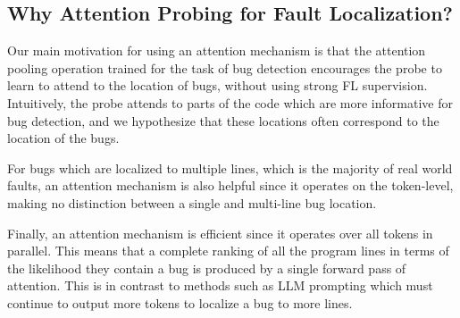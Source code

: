 \subsection{Why Attention Probing for Fault Localization?}
Our main motivation for using an attention mechanism is that the attention pooling operation trained for the task of bug detection encourages the probe to learn to attend to the location of bugs, without using strong FL supervision.
Intuitively, the probe attends to parts of the code which are more informative for bug detection, and we hypothesize that these locations often correspond to the location of the bugs.

For bugs which are localized to multiple lines, which is the majority of real world faults, an attention mechanism is also helpful since it operates on the token-level, making no distinction between a single and multi-line bug location.


Finally, an attention mechanism is efficient since it operates over all tokens in parallel. This means that a complete ranking of all the program lines in terms of the likelihood they contain a bug is produced by a single forward pass of attention. This is in contrast to methods such as LLM prompting which must continue to output more tokens to localize a bug to more lines.


